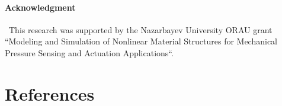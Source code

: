 \documentclass[review]{elsarticle}
\begin{document}
\paragraph{{\bf Acknowledgment}}{~This research was supported by the Nazarbayev University ORAU grant ``Modeling and Simulation of Nonlinear Material Structures for Mechanical Pressure Sensing and Actuation Applications``.}

%
\section*{References}

\end{document}
